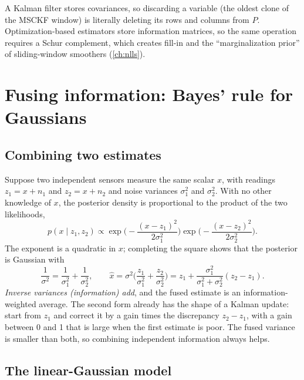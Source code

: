 \begin{keyidea}
A Kalman filter stores covariances, so discarding a variable (the oldest clone of the MSCKF window) is literally deleting its rows and
columns from $P$. Optimization-based estimators store information matrices, so the same operation requires a Schur complement, which
creates fill-in and the ``marginalization prior'' of sliding-window smoothers (\cref{ch:nlls}).
\end{keyidea}

\section{Fusing information: Bayes' rule for Gaussians}

\subsection{Combining two estimates}

Suppose two independent sensors measure the same scalar $x$, with readings $z_1 = x + n_1$ and $z_2 = x + n_2$ and noise variances $\sigma_1^2$ and
$\sigma_2^2$. With no other knowledge of $x$, the posterior density is proportional to the product of the two likelihoods,
\begin{equation}
  p(x\mid z_1, z_2) \propto \exp\!\Big(-\frac{(x - z_1)^2}{2\sigma_1^2}\Big)\exp\!\Big(-\frac{(x - z_2)^2}{2\sigma_2^2}\Big).
\end{equation}
The exponent is a quadratic in $x$; completing the square shows that the posterior is Gaussian with
\begin{equation}
  \frac{1}{\sigma^2} = \frac1{\sigma_1^2} + \frac1{\sigma_2^2}, \qquad
  \hat x = \sigma^2\Big(\frac{z_1}{\sigma_1^2} + \frac{z_2}{\sigma_2^2}\Big) = z_1 + \frac{\sigma_1^2}{\sigma_1^2 + \sigma_2^2}(z_2 - z_1).
  \label{eq:fusion}
\end{equation}
\emph{Inverse variances (information) add}, and the fused estimate is an information-weighted average. The second form already has the shape
of a Kalman update: start from $z_1$ and correct it by a gain times the discrepancy $z_2 - z_1$, with a gain between 0 and 1 that is large
when the first estimate is poor. The fused variance is smaller than both, so combining independent information always helps.

\subsection{The linear-Gaussian model}


